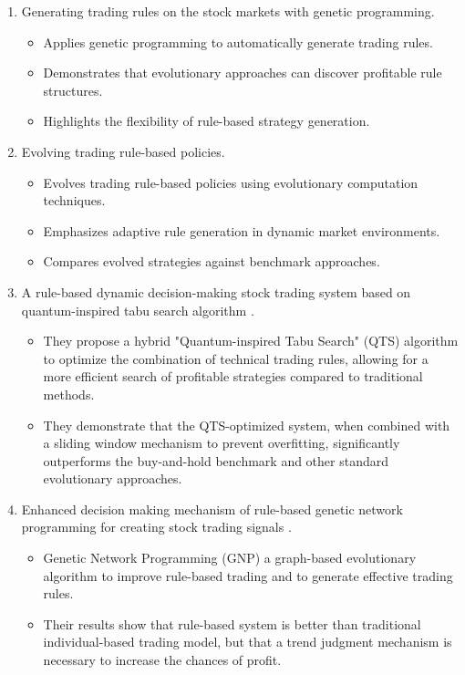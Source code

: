 \begin{enumerate}
    \item Generating trading rules on the stock markets with genetic programming. 
    \cite{potvin2004generating} 

    \begin{itemize}
        \item Applies genetic programming to automatically generate trading rules.
        \item Demonstrates that evolutionary approaches can discover profitable rule structures.
        \item Highlights the flexibility of rule-based strategy generation.
    \end{itemize}

     \item Evolving trading rule-based policies. 
    \cite{bradley2010evolving} 

    \begin{itemize}
        \item Evolves trading rule-based policies using evolutionary computation techniques.
        \item Emphasizes adaptive rule generation in dynamic market environments.
        \item Compares evolved strategies against benchmark approaches.
    \end{itemize}
    
    \item A rule-based dynamic decision-making stock trading system based on quantum-inspired tabu search algorithm 
    \cite{chou2014rule}.
    
    \begin{itemize}
        \item They propose a hybrid "Quantum-inspired Tabu Search" (QTS) algorithm to optimize the combination of technical trading rules, allowing for a more efficient search of profitable strategies compared to traditional methods.
        \item They demonstrate that the QTS-optimized system, when combined with a sliding window mechanism to prevent overfitting, significantly outperforms the buy-and-hold benchmark and other standard evolutionary approaches.
    \end{itemize}

    \item Enhanced decision making mechanism of rule-based genetic network programming for creating stock trading signals
    \cite{mabu2013enhanced}.
    \begin{itemize}
        \item Genetic Network Programming (GNP) a graph-based evolutionary algorithm to improve rule-based trading and to generate effective trading rules.
        \item Their results show that rule-based system is better than traditional individual-based trading model, but that a trend judgment mechanism is necessary to increase the chances of profit.
    \end{itemize}


\end{enumerate}
